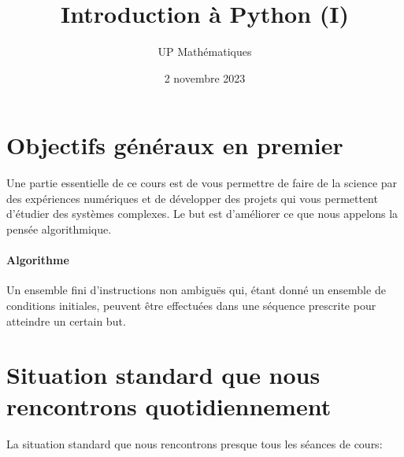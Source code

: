 \documentclass[%
oneside,                 %
final,                   %
10pt]{article}
\begin{document}

\newcommand{\exercisesection}[1]{\subsection*{#1}}






\title{Introduction à Python (I)}


\author{UP Mathématiques}

\date{2 novembre 2023
}

\section{Objectifs généraux en premier}

Une partie essentielle de ce cours est de vous permettre de faire de la science par des expériences numériques et de développer des projets qui vous permettent d'étudier des systèmes complexes. Le but est d'améliorer ce que nous appelons la pensée algorithmique.

\paragraph{Algorithme}
Un ensemble fini d'instructions non ambiguës qui, étant donné un ensemble de conditions initiales, peuvent être effectuées dans une séquence prescrite pour atteindre un certain but.

\section{Situation standard que nous rencontrons quotidiennement}

La situation standard que nous rencontrons presque tous les séances de cours:
\end{document}
